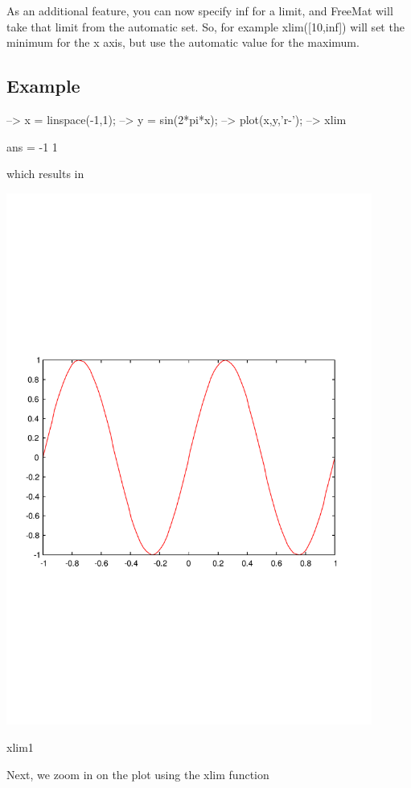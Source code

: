 As an additional feature, you can now specify {\ttfamily inf} for a limit, and Free\-Mat will take that limit from the automatic set. So, for example {\ttfamily xlim(\mbox{[}10,inf\mbox{]})} will set the minimum for the x axis, but use the automatic value for the maximum. \hypertarget{variables_struct_Example}{}\subsection{Example}\label{variables_struct_Example}

\begin{DoxyVerbInclude}
--> x = linspace(-1,1);
--> y = sin(2*pi*x);
--> plot(x,y,'r-');
--> xlim  %

ans = 
 -1  1 
\end{DoxyVerbInclude}


which results in  
\begin{DoxyImage}
\includegraphics[width=12cm]{xlim1}
\caption{xlim1}
\end{DoxyImage}
 Next, we zoom in on the plot using the {\ttfamily xlim} function


